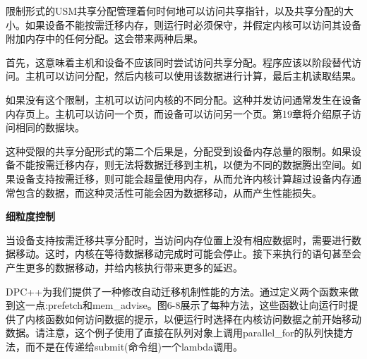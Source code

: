 限制形式的USM共享分配管理着何时何地可以访问共享指针，以及共享分配的大小。如果设备不能按需迁移内存，则运行时必须保守，并假定内核可以访问其设备附加内存中的任何分配。这会带来两种后果。\par

首先，这意味着主机和设备不应该同时尝试访问共享分配。程序应该以阶段替代访问。主机可以访问分配，然后内核可以使用该数据进行计算，最后主机读取结果。\par

如果没有这个限制，主机可以访问内核的不同分配。这种并发访问通常发生在设备内存页上。主机可以访问一个页，而设备可以访问另一个页。第19章将介绍原子访问相同的数据块。\par

这种受限的共享分配形式的第二个后果是，分配受到设备内存总量的限制。如果设备不能按需迁移内存，则无法将数据迁移到主机，以便为不同的数据腾出空间。如果设备支持按需迁移，则可能会超量使用内存，从而允许内核计算超过设备内存通常包含的数据，而这种灵活性可能会因为数据移动，从而产生性能损失。\par

\hspace*{\fill} \par %
\textbf{细粒度控制}

当设备支持按需迁移共享分配时，当访问内存位置上没有相应数据时，需要进行数据移动。这时，内核在等待数据移动完成时可能会停止。接下来执行的语句甚至会产生更多的数据移动，并给内核执行带来更多的延迟。\par

DPC++为我们提供了一种修改自动迁移机制性能的方法。通过定义两个函数来做到这一点:prefetch和mem\_advise。图6-8展示了每种方法，这些函数让向运行时提供了内核函数如何访问数据的提示，以便运行时选择在内核访问数据之前开始移动数据。请注意，这个例子使用了直接在队列对象上调用parallel\_for的队列快捷方法，而不是在传递给submit(命令组)一个lambda调用。\par

